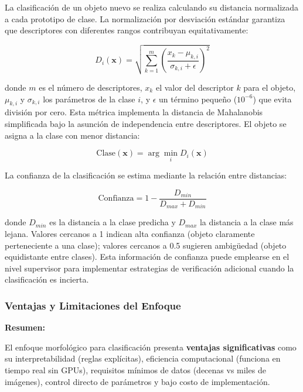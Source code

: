La clasificación de un objeto nuevo se realiza calculando su distancia normalizada a cada prototipo de clase. La normalización por desviación estándar garantiza que descriptores con diferentes rangos contribuyan equitativamente:

\begin{equation}
D_i(\mathbf{x}) = \sqrt{\sum_{k=1}^{m} \left(\frac{x_k - \mu_{k,i}}{\sigma_{k,i} + \epsilon}\right)^2}
\end{equation}

donde $m$ es el número de descriptores, $x_k$ el valor del descriptor $k$ para el objeto, $\mu_{k,i}$ y $\sigma_{k,i}$ los parámetros de la clase $i$, y $\epsilon$ un término pequeño ($10^{-6}$) que evita división por cero. Esta métrica implementa la distancia de Mahalanobis simplificada bajo la asunción de independencia entre descriptores. El objeto se asigna a la clase con menor distancia:

\begin{equation}
\text{Clase}(\mathbf{x}) = \arg\min_{i} D_i(\mathbf{x})
\end{equation}

La confianza de la clasificación se estima mediante la relación entre distancias:

\begin{equation}
\text{Confianza} = 1 - \frac{D_{min}}{D_{max} + D_{min}}
\end{equation}

donde $D_{min}$ es la distancia a la clase predicha y $D_{max}$ la distancia a la clase más lejana. Valores cercanos a 1 indican alta confianza (objeto claramente perteneciente a una clase); valores cercanos a 0.5 sugieren ambigüedad (objeto equidistante entre clases). Esta información de confianza puede emplearse en el nivel supervisor para implementar estrategias de verificación adicional cuando la clasificación es incierta.

\subsubsection{Ventajas y Limitaciones del Enfoque}

\textbf{Resumen:}

El enfoque morfológico para clasificación presenta \textbf{ventajas significativas} como su interpretabilidad (reglas explícitas), eficiencia computacional (funciona en tiempo real sin GPUs), requisitos mínimos de datos (decenas vs miles de imágenes), control directo de parámetros y bajo costo de implementación.

